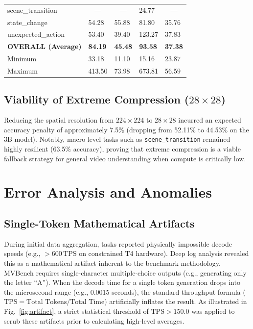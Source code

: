 \documentclass[conference]{IEEEtran}
\begin{document}
\begin{table}[!t]
\begin{tabularx}{\textwidth}{>{\raggedright\arraybackslash}p{4.5cm} YYYY}
    scene\_transition          &  &  &  24.77 &  \\
    state\_change              & 54.28  & 55.88 & 81.80  & 35.76 \\
    unexpected\_action          & 53.40  & 39.40 & 123.27 & 37.83 \\
    \midrule
    \textbf{OVERALL (Average)} & \textbf{84.19} & \textbf{45.48} & \textbf{93.58} & \textbf{37.38} \\
    Minimum                    & 33.18  & 11.10 &  15.16 & 23.87 \\
    Maximum                    & 413.50 & 73.98 & 673.81 & 56.59 \\
    \bottomrule
  \end{tabularx}
\end{table}

\subsection{Viability of Extreme Compression \texorpdfstring{($28{\times}28$)}{(28x28)}}

Reducing the spatial resolution from $224{\times}224$ to $28{\times}28$
incurred an expected accuracy penalty of approximately 7.5\% (dropping
from 52.11\% to 44.53\% on the 3B model). Notably, macro-level tasks
such as \texttt{scene\_transition} remained highly resilient (63.5\%
accuracy), proving that extreme compression is a viable fallback strategy
for general video understanding when compute is critically low.

\section{Error Analysis and Anomalies}
\label{sec:error}

\subsection{Single-Token Mathematical Artifacts}

During initial data aggregation, tasks reported physically impossible
decode speeds (e.g., $>$600\,TPS on constrained T4 hardware). Deep log
analysis revealed this as a mathematical artifact inherent to the
benchmark methodology. MVBench requires single-character multiple-choice
outputs (e.g., generating only the letter ``A''). When the decode time
for a single token generation drops into the microsecond range (e.g.,
0.0015 seconds), the standard throughput formula
($\text{TPS} = \text{Total Tokens} / \text{Total Time}$) artificially
inflates the result. As illustrated in Fig.~\ref{fig:artifact}, a strict
statistical threshold of $\text{TPS} > 150.0$ was applied to scrub these
artifacts prior to calculating high-level averages.
\end{document}
